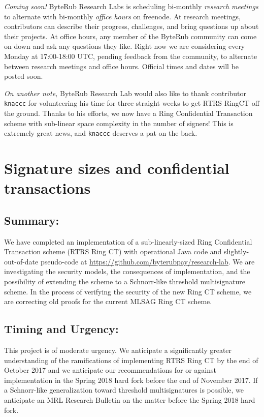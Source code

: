 \documentclass[12pt,english]{mrl}
\theoremstyle{definition}
\numberwithin{equation}{section}
\numberwithin{figure}{section}
\numberwithin{equation}{section}
\numberwithin{equation}{section}
\numberwithin{figure}{section}
\begin{document}
\textit{Coming soon!} ByteRub Research Labs is scheduling bi-monthly \textit{research meetings} to alternate with bi-monthly \textit{office hours} on freenode. At research meetings, contributors can describe their progress, challenges, and bring questions up about their projects. At office hours, any member of the ByteRub community can come on down and ask any questions they like. Right now we are considering every Monday at 17:00-18:00 UTC, pending feedback from the community, to alternate between research meetings and office hours. Official times and dates will be posted soon.

\textit{On another note,} ByteRub Research Lab would also like to thank contributor \texttt{knaccc} for volunteering his time for three straight weeks to get RTRS RingCT off the ground. Thanks to his efforts, we now have a Ring Confidential Transaction scheme with sub-linear space complexity in the number of signers! This is extremely great news, and \texttt{knaccc} deserves a pat on the back.


\vspace{0.1in}

\section{Signature sizes and confidential transactions} \label{secOne}

\subsection{Summary:} 

We have completed an implementation of a sub-linearly-sized Ring Confidential Transaction scheme (RTRS Ring CT) with operational Java code and slightly-out-of-date pseudo-code at \url{https://github.com/byterubpay/research-lab}. We are investigating the security models, the consequences of implementation, and the possibility of extending the scheme to a Schnorr-like threshold multisignature scheme. In the process of verifying the security of the new Ring CT scheme, we are correcting old proofs for the current MLSAG Ring CT scheme.

\subsection{Timing and Urgency:} 

This project is of moderate urgency. We anticipate a significantly greater understanding of the ramifications of implementing RTRS Ring CT by the end of October 2017 and we anticipate our recommendations for or against implementation in the Spring 2018 hard fork before the end of November 2017. If a Schnorr-like generalization toward threshold multisignatures is possible, we anticipate an MRL Research Bulletin on the matter before the Spring 2018 hard fork.
\end{document}
